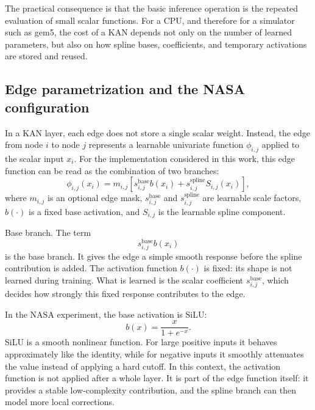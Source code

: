 \documentclass[11pt,a4paper]{article}
\begin{document}
The practical consequence is that the basic inference operation is the repeated evaluation of small scalar functions.
For a CPU, and therefore for a simulator such as gem5, the cost of a KAN depends not only on the number of learned parameters, but also on how spline bases, coefficients, and temporary activations are stored and reused.

\subsection{Edge parametrization and the NASA configuration}

In a KAN layer, each edge does not store a single scalar weight.
Instead, the edge from node $i$ to node $j$ represents a learnable univariate function
$\phi_{i,j}$ applied to the scalar input $x_i$.
For the implementation considered in this work, this edge function can be read as the combination of two branches:
\begin{equation}
    \phi_{i,j}(x_i)
    =
    m_{i,j}
    \left[
        s^{\mathrm{base}}_{i,j} b(x_i)
        +
        s^{\mathrm{spline}}_{i,j} S_{i,j}(x_i)
    \right],
    \label{eq:edge_function}
\end{equation}
where $m_{i,j}$ is an optional edge mask, 
$s^{\mathrm{base}}_{i,j}$ and $s^{\mathrm{spline}}_{i,j}$ are learnable scale factors, 
$b(\cdot)$ is a fixed base activation, and $S_{i,j}$ is the learnable spline component.

Base branch.
The term
\begin{equation}
    s^{\mathrm{base}}_{i,j} b(x_i)
\end{equation}
is the base branch.
It gives the edge a simple smooth response before the spline contribution is added.
The activation function $b(\cdot)$ is fixed: its shape is not learned during training.
What is learned is the scalar coefficient $s^{\mathrm{base}}_{i,j}$, which decides how strongly this fixed response contributes to the edge.

In the NASA experiment, the base activation is SiLU:
\begin{equation}
    b(x) = \frac{x}{1 + e^{-x}}.
\end{equation}
SiLU is a smooth nonlinear function.
For large positive inputs it behaves approximately like the identity, while for negative inputs it smoothly attenuates the value instead of applying a hard cutoff.
In this context, the activation function is not applied after a whole layer.
It is part of the edge function itself: it provides a stable low-complexity contribution, and the spline branch can then model more local corrections.
\end{document}
